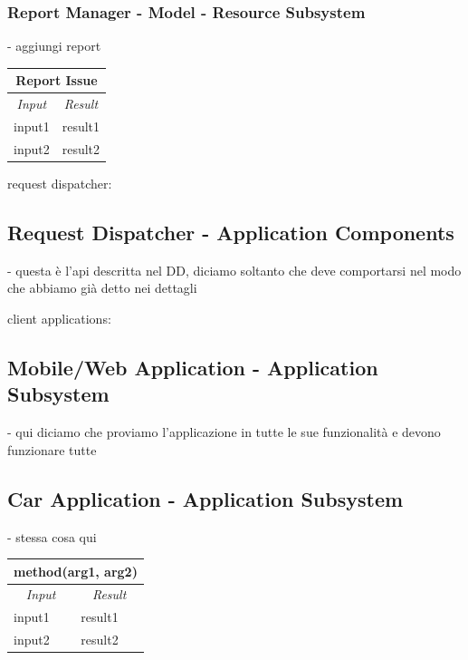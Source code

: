 \documentclass[english]{article}
\begin{document}
\subsubsection{Report Manager - Model - Resource Subsystem}
- aggiungi report

\begin{center}
	\begin{tabular}{ | m{6cm} | m{6cm} | }
		\hline 
		\multicolumn{2}{|c|}{\textbf{Report Issue}} \\
		\hline
		\multicolumn{1}{|c|}{\textit{Input}} & \multicolumn{1}{c|}{\textit{Result}} \\
		\hline
		input1 & result1 \\
		\hline
		input2 & result2 \\
		\hline
	\end{tabular}
\end{center}

request dispatcher:
\subsection{Request Dispatcher - Application Components}
- questa è l'api descritta nel DD, diciamo soltanto che deve comportarsi nel modo che abbiamo già detto nei dettagli

client applications:
\subsection{Mobile/Web Application - Application Subsystem}
- qui diciamo che proviamo l'applicazione in tutte le sue funzionalità e devono funzionare tutte

\subsection{Car Application - Application Subsystem}
- stessa cosa qui

\begin{center}
	\begin{tabular}{ | m{6cm} | m{6cm} | }
		\hline 
		\multicolumn{2}{|c|}{\textbf{method(arg1, arg2)}} \\
		\hline
		\multicolumn{1}{|c|}{\textit{Input}} & \multicolumn{1}{c|}{\textit{Result}} \\
		\hline
		input1 & result1 \\
		\hline
		input2 & result2 \\
		\hline
	\end{tabular}
\end{center}
\end{document}
